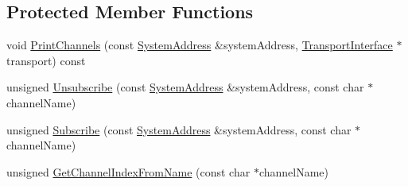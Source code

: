 \subsection*{Protected Member Functions}
\begin{DoxyCompactItemize}
\item 
void \hyperlink{class_rak_net_1_1_log_command_parser_ae1cb6d17a66cfc18261d18b0964a9de7}{Print\-Channels} (const \hyperlink{struct_rak_net_1_1_system_address}{System\-Address} \&system\-Address, \hyperlink{class_rak_net_1_1_transport_interface}{Transport\-Interface} $\ast$transport) const 
\item 
unsigned \hyperlink{class_rak_net_1_1_log_command_parser_a615d8f7044092dee6bdfd52066d3e6dc}{Unsubscribe} (const \hyperlink{struct_rak_net_1_1_system_address}{System\-Address} \&system\-Address, const char $\ast$channel\-Name)
\item 
unsigned \hyperlink{class_rak_net_1_1_log_command_parser_a3f479d9fb28698d197c6ac51c7b25b0b}{Subscribe} (const \hyperlink{struct_rak_net_1_1_system_address}{System\-Address} \&system\-Address, const char $\ast$channel\-Name)
\item 
unsigned \hyperlink{class_rak_net_1_1_log_command_parser_a09d6177683edf34c5aa8dca6738805f6}{Get\-Channel\-Index\-From\-Name} (const char $\ast$channel\-Name)
\end{DoxyCompactItemize}
